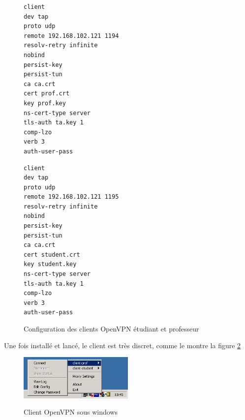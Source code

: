 \begin{figure}[H]
	\begin{minipage}{0.50\textwidth}
		\begin{flushleft}
			\begin{minipage}{0.90\textwidth}
				\begin{lstlisting}[frame=trBL]
client
dev tap
proto udp
remote 192.168.102.121 1194
resolv-retry infinite
nobind
persist-key
persist-tun
ca ca.crt
cert prof.crt
key prof.key
ns-cert-type server
tls-auth ta.key 1
comp-lzo
verb 3
auth-user-pass
				\end{lstlisting}
			\end{minipage}
		\end{flushleft}
	\end{minipage}
	\begin{minipage}{0.49\textwidth}
		\begin{flushright}
			\begin{minipage}{0.90\textwidth}
				\begin{lstlisting}[frame=trBL]
client
dev tap
proto udp
remote 192.168.102.121 1195
resolv-retry infinite
nobind
persist-key
persist-tun
ca ca.crt
cert student.crt
key student.key
ns-cert-type server
tls-auth ta.key 1
comp-lzo
verb 3
auth-user-pass
				\end{lstlisting}
			\end{minipage}
		\end{flushright}
	\end{minipage}
	\caption{Configuration des clients OpenVPN étudiant et professeur}
	\label{config_openvpn_client_student}
\end{figure}

Une fois installé et lancé, le client est très discret, comme le montre la figure \ref{openvpn_screen_windows}

\begin{figure}[H]
	\begin{center}
		\includegraphics[width=0.50\textwidth]{partie_2/images/openvpn-client-connect.png}\\
	\end{center}
	\caption{Client OpenVPN sous windows}
	\label{openvpn_screen_windows}
\end{figure}


